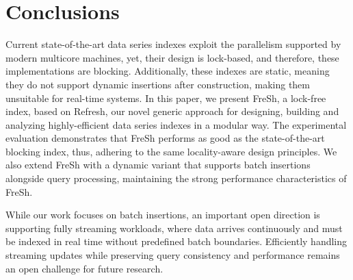 \documentclass[a4paper,11pt,twoside,openany]{book}
\begin{document}


\chapter{Conclusions}
\label{chapter:Conclusions}

Current state-of-the-art data series indexes exploit the parallelism
supported by modern multicore machines, yet, their
design is lock-based, and therefore, these implementations are
blocking. Additionally, these indexes are static, meaning they do not support
dynamic insertions after construction, making them unsuitable for real-time systems.
In this paper, we present FreSh, a lock-free index,
based on Refresh, our novel generic approach for designing,
building and analyzing highly-efficient data series indexes in a
modular way. The experimental evaluation demonstrates that
FreSh performs as good as the state-of-the-art blocking index,
thus, adhering to the same locality-aware design principles.
We also extend FreSh with a dynamic variant that supports batch insertions
alongside query processing, maintaining the strong performance characteristics of FreSh.

While our work focuses on batch insertions, an important open direction is supporting
fully streaming workloads, where data arrives continuously and must be indexed in real
time without predefined batch boundaries. Efficiently handling streaming updates while
preserving query consistency and performance remains an open challenge for future research.




{}

\end{document}
